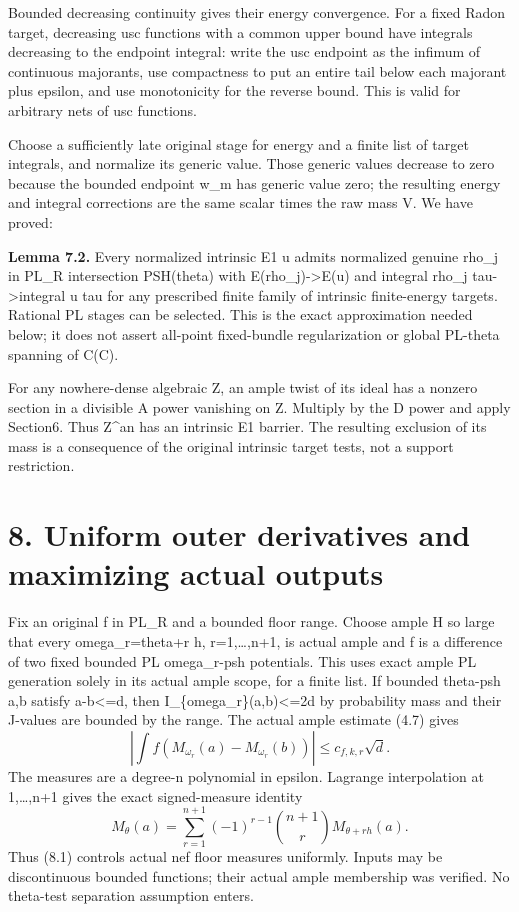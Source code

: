 \documentclass[
  10pt,
]{article}
\begin{document}
Bounded decreasing continuity gives their energy convergence. For a
fixed Radon target, decreasing usc functions with a common upper bound
have integrals decreasing to the endpoint integral: write the usc
endpoint as the infimum of continuous majorants, use compactness to put
an entire tail below each majorant plus epsilon, and use monotonicity
for the reverse bound. This is valid for arbitrary nets of usc
functions.

Choose a sufficiently late original stage for energy and a finite list
of target integrals, and normalize its generic value. Those generic
values decrease to zero because the bounded endpoint w\_m has generic
value zero; the resulting energy and integral corrections are the same
scalar times the raw mass V. We have proved:

\textbf{Lemma 7.2.} Every normalized intrinsic E1 u admits normalized
genuine rho\_j in PL\_R intersection PSH(theta) with
E(rho\_j)-\textgreater E(u) and integral rho\_j
tau-\textgreater integral u tau for any prescribed finite family of
intrinsic finite-energy targets. Rational PL stages can be selected.
This is the exact approximation needed below; it does not assert
all-point fixed-bundle regularization or global PL-theta spanning of
C(C).

For any nowhere-dense algebraic Z, an ample twist of its ideal has a
nonzero section in a divisible A power vanishing on Z. Multiply by the D
power and apply Section6. Thus Z\^{}an has an intrinsic E1 barrier. The
resulting exclusion of its mass is a consequence of the original
intrinsic target tests, not a support restriction.

\section{8. Uniform outer derivatives and maximizing actual
outputs}\label{uniform-outer-derivatives-and-maximizing-actual-outputs}

Fix an original f in PL\_R and a bounded floor range. Choose ample H so
large that every omega\_r=theta+r h, r=1,\ldots,n+1, is actual ample and
f is a difference of two fixed bounded PL omega\_r-psh potentials. This
uses exact ample PL generation solely in its actual ample scope, for a
finite list. If bounded theta-psh a,b satisfy
\textbar\textbar a-b\textbar\textbar\textless=d, then
I\_\{omega\_r\}(a,b)\textless=2d by probability mass and their J-values
are bounded by the range. The actual ample estimate (4.7) gives \[
 \left|\int f(M_{\omega_r}(a)-M_{\omega_r}(b))\right|\le c_{f,k,r}\sqrt d. \tag{8.1}
\] The measures are a degree-n polynomial in epsilon. Lagrange
interpolation at 1,\ldots,n+1 gives the exact signed-measure identity \[
 M_\theta(a)=\sum_{r=1}^{n+1}(-1)^{r-1}\binom{n+1}r M_{\theta+r h}(a).    \tag{8.2}
\] Thus (8.1) controls actual nef floor measures uniformly. Inputs may
be discontinuous bounded functions; their actual ample membership was
verified. No theta-test separation assumption enters.
\end{document}
